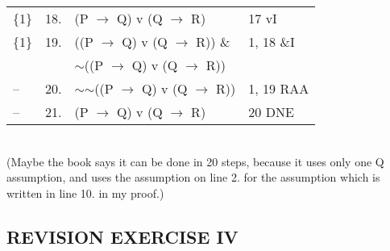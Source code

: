 \documentclass[a4paper,12pt]{article}
\newcommand{\mra}{$\rightarrow$ }
\newcommand{\ms}{$\sim$}
\begin{document}
\begin{enumerate}[label=\arabic*,leftmargin=*]
\begin{enumerate}[label=\arabic*.]
\begin{minipage}{\textwidth}
\begin{tabular}{l l l l}
                        \{1\} & 18. & (P \mra Q) v (Q \mra R) & 17 vI\\
                        \{1\} & 19. & ((P \mra Q) v (Q \mra R)) \& & 1, 18 \&I\\
                         & &  \ms ((P \mra Q) v (Q \mra R)) & \\
                        -- & 20. & \ms \ms ((P \mra Q) v (Q \mra R)) & 1, 19 RAA\\
                        -- & 21. & (P \mra Q) v (Q \mra R) & 20 DNE\\
                    \end{tabular}\\
                    (Maybe the book says it can be done in 20 steps, because it uses only one Q assumption, and uses the assumption on line 2. for the assumption which is written in line 10. in my proof.)
                \end{minipage}

        \end{enumerate}
    \end{enumerate}

    \subsection*{REVISION EXERCISE IV}
\end{document}
